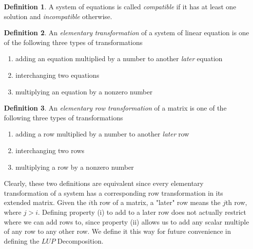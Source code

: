 \documentclass{article}
\theoremstyle{remark}
\theoremstyle{definition}
\newtheorem{definition}{Definition}[section]
\begin{document}
    \begin{definition}
    A system of equations is called \textit{compatible} if it has at least one solution and \textit{incompatible} otherwise. 
    \end{definition}

    \begin{definition}
    An \textit{elementary transformation} of a system of linear equation is one of the following three types of transformations
    \begin{enumerate}
        \item adding an equation multiplied by a number to another \textit{later} equation
        \item interchanging two equations
        \item multiplying an equation by a nonzero number
    \end{enumerate}
    \end{definition}

    \begin{definition}
    An \textit{elementary row transformation} of a matrix is one of the following three types of transformations
    \begin{enumerate}
        \item adding a row multiplied by a number to another \textit{later} row
        \item interchanging two rows
        \item multiplying a row by a nonzero number
    \end{enumerate}
    \end{definition}

    Clearly, these two definitions are equivalent since every elementary transformation of a system has a corresponding row transformation in its extended matrix. Given the $i$th row of a matrix, a "later" row means the $j$th row, where $j > i$. Defining property (i) to add to a later row does not actually restrict where we can add rows to, since property (ii) allows us to add any scalar multiple of any row to any other row. We define it this way for future convenience in defining the $L U P$ Decomposition. 
\end{document}
